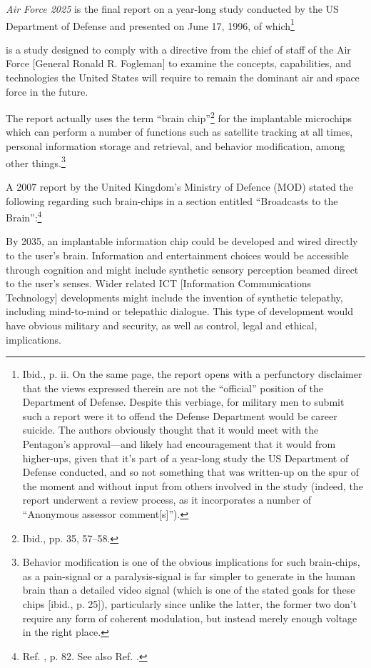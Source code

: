 \documentclass[letterpaper,12pt]{article}
\newenvironment{squote}
  {\small\quote}
  {\endquote\normalsize}
\begin{document}
\emph{Air Force 2025} is the final report on a year-long study conducted by the US Department of Defense and presented on June 17, 1996, of which\footnote{Ibid., p. ii. On the same page, the report opens with a perfunctory disclaimer that the views expressed therein are not the ``official'' position of the Department of Defense. Despite this verbiage, for military men to submit such a report were it to offend the Defense Department would be career suicide. The authors obviously thought that it would meet with the Pentagon's approval---and likely had encouragement that it would from higher-ups, given that it's part of a year-long study the US Department of Defense conducted, and so not something that was written-up on the spur of the moment and without input from others involved in the study (indeed, the report underwent a review process, as it incorporates a number of ``Anonymous assessor comment[s]'').}

\begin{squote}
is a study designed to comply with a directive from the chief of staff of the Air Force [General Ronald R. Fogleman] to examine the concepts, capabilities, and technologies the United States will require to remain the dominant air and space force in the future.
\end{squote}

The report actually uses the term ``brain chip''\footnote{Ibid., pp. 35, 57--58.} for the implantable microchips which can perform a number of functions such as satellite tracking at all times, personal information storage and retrieval, and behavior modification, among other things.\footnote{Behavior modification is one of the obvious implications for such brain-chips, as a pain-signal or a paralysis-signal is far simpler to generate in the human brain than a detailed video signal (which is one of the stated goals for these chips [ibid., p. 25]), particularly since unlike the latter, the former two don't require any form of coherent modulation, but instead merely enough voltage in the right place.}

A 2007 report by the United Kingdom's Ministry of Defence (MOD) stated the following regarding such brain-chips in a section entitled ``Broadcasts to the Brain'':\footnote{Ref. , p. 82. See also Ref. .}

\begin{squote}
By 2035, an implantable information chip could be developed and wired directly to the user's brain. Information and entertainment choices would be accessible through cognition and might include synthetic sensory perception beamed direct to the user's senses. Wider related ICT [Information Communications Technology] developments might include the invention of synthetic telepathy, including mind-to-mind or telepathic dialogue. This type of development would have obvious military and security, as well as control, legal and ethical, implications.
\end{squote}
\end{document}
